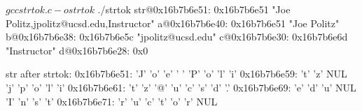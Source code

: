 \documentclass[12pt, oneside, landscape]{article}
\begin{document}

\begin{minipage}[t]{0.45\textwidth}



\begin{shell}[linewidth=34em, basicstyle=\ttfamily\scriptsize]
$ gcc strtok.c -o strtok
$ ./strtok
str@0x16b7b6e51: 0x16b7b6e51 "Joe Politz,jpolitz@ucsd.edu,Instructor"
a@0x16b7b6e40: 0x16b7b6e51 "Joe Politz"
b@0x16b7b6e38: 0x16b7b6e5c "jpolitz@ucsd.edu"
c@0x16b7b6e30: 0x16b7b6e6d "Instructor"
d@0x16b7b6e28: 0x0

str after strtok:
0x16b7b6e51: 'J' 'o' 'e' ' ' 'P' 'o' 'l' 'i'
0x16b7b6e59: 't' 'z' NUL 'j' 'p' 'o' 'l' 'i'
0x16b7b6e61: 't' 'z' '@' 'u' 'c' 's' 'd' '.'
0x16b7b6e69: 'e' 'd' 'u' NUL 'I' 'n' 's' 't'
0x16b7b6e71: 'r' 'u' 'c' 't' 'o' 'r' NUL
\end{shell}

\end{minipage}
\end{document}

